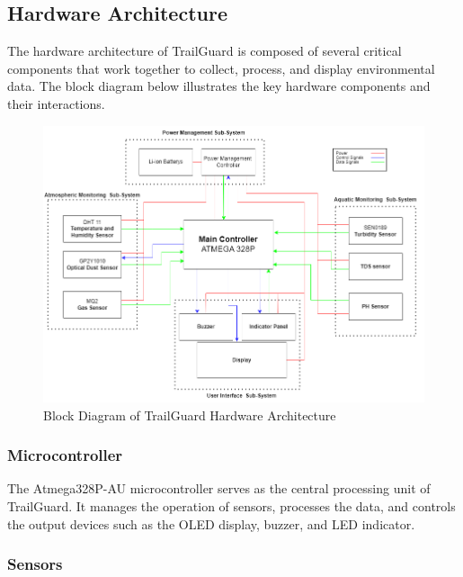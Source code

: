 \documentclass[a4paper,11pt]{article}%
\begin{document}
\subsection{Hardware Architecture}
The hardware architecture of TrailGuard is composed of several critical components that work together to collect, process, and display environmental data. The block diagram below illustrates the key hardware components and their interactions.
\begin{figure}[!h]
    \centering
    \includegraphics[scale=0.45]{figures/Block Diagram.png}
    \caption{Block Diagram of TrailGuard Hardware Architecture}
\end{figure}

\subsubsection{Microcontroller} 
The Atmega328P-AU microcontroller serves as the central processing unit of TrailGuard. It manages the operation of sensors, processes the data, and controls the output devices such as the OLED display, buzzer, and LED indicator.

\subsubsection{Sensors}
\end{document}
